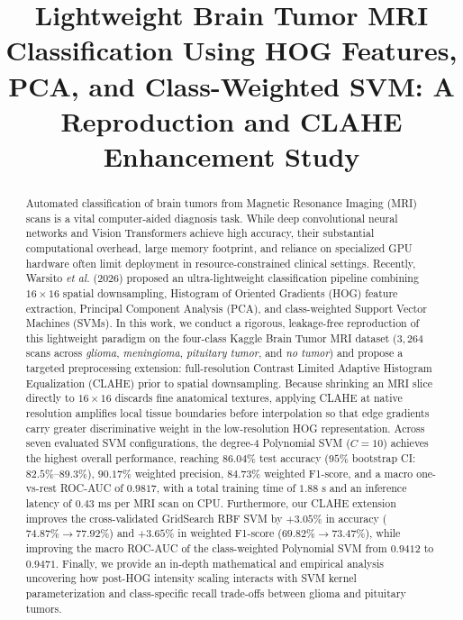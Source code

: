 \documentclass[conference]{IEEEtran}
\begin{document}
\title{Lightweight Brain Tumor MRI Classification Using HOG Features, PCA, and Class-Weighted SVM: A Reproduction and CLAHE Enhancement Study}

\author{
\and
{}
\and
{}
}

\maketitle

\begin{abstract}
Automated classification of brain tumors from Magnetic Resonance Imaging (MRI) scans is a vital computer-aided diagnosis task. While deep convolutional neural networks and Vision Transformers achieve high accuracy, their substantial computational overhead, large memory footprint, and reliance on specialized GPU hardware often limit deployment in resource-constrained clinical settings. Recently, Warsito \emph{et al.} (2026) proposed an ultra-lightweight classification pipeline combining $16 \times 16$ spatial downsampling, Histogram of Oriented Gradients (HOG) feature extraction, Principal Component Analysis (PCA), and class-weighted Support Vector Machines (SVMs). In this work, we conduct a rigorous, leakage-free reproduction of this lightweight paradigm on the four-class Kaggle Brain Tumor MRI dataset ($3,264$ scans across \emph{glioma}, \emph{meningioma}, \emph{pituitary tumor}, and \emph{no tumor}) and propose a targeted preprocessing extension: full-resolution Contrast Limited Adaptive Histogram Equalization (CLAHE) prior to spatial downsampling. Because shrinking an MRI slice directly to $16 \times 16$ discards fine anatomical textures, applying CLAHE at native resolution amplifies local tissue boundaries before interpolation so that edge gradients carry greater discriminative weight in the low-resolution HOG representation. Across seven evaluated SVM configurations, the degree-4 Polynomial SVM ($C=10$) achieves the highest overall performance, reaching $86.04\%$ test accuracy ($95\%$ bootstrap CI: $82.5\%\text{--}89.3\%$), $90.17\%$ weighted precision, $84.73\%$ weighted F1-score, and a macro one-vs-rest ROC-AUC of $0.9817$, with a total training time of $1.88\text{ s}$ and an inference latency of $0.43\text{ ms}$ per MRI scan on CPU. Furthermore, our CLAHE extension improves the cross-validated GridSearch RBF SVM by $+3.05\%$ in accuracy ($74.87\% \rightarrow 77.92\%$) and $+3.65\%$ in weighted F1-score ($69.82\% \rightarrow 73.47\%$), while improving the macro ROC-AUC of the class-weighted Polynomial SVM from $0.9412$ to $0.9471$. Finally, we provide an in-depth mathematical and empirical analysis uncovering how post-HOG intensity scaling interacts with SVM kernel parameterization and class-specific recall trade-offs between glioma and pituitary tumors.
\end{abstract}
\end{document}
